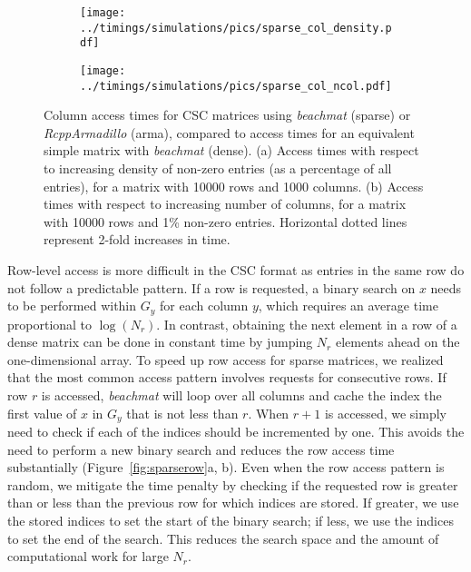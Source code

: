 \documentclass[10pt,letterpaper]{article}
\newcommand{\beachmat}{\textit{beachmat}}
\begin{document}

\begin{figure}[bt]
    \centering
    \begin{subfigure}[b]{0.49\textwidth}
        \texttt{[image: ../timings/simulations/pics/sparse\_col\_density.pdf]}
        \caption{}
    \end{subfigure}
    \begin{subfigure}[b]{0.49\textwidth}
        \texttt{[image: ../timings/simulations/pics/sparse\_col\_ncol.pdf]}
        \caption{}
    \end{subfigure}
    \caption{Column access times for CSC matrices using \beachmat{} (sparse) or \textit{RcppArmadillo} (arma), compared to access times for an equivalent simple matrix with \beachmat{} (dense).
        (a) Access times with respect to increasing density of non-zero entries (as a percentage of all entries), for a matrix with 10000 rows and 1000 columns.
        (b) Access times with respect to increasing number of columns, for a matrix with 10000 rows and 1\% non-zero entries.
        Horizontal dotted lines represent 2-fold increases in time.
    }
    \label{fig:sparsecol}
\end{figure}

Row-level access is more difficult in the CSC format as entries in the same row do not follow a predictable pattern.
If a row is requested, a binary search on $x$ needs to be performed within $G_y$ for each column $y$, which requires an average time proportional to $\log(N_r)$.
In contrast, obtaining the next element in a row of a dense matrix can be done in constant time by jumping $N_r$ elements ahead on the one-dimensional array.
To speed up row access for sparse matrices, we realized that the most common access pattern involves requests for consecutive rows.
If row $r$ is accessed, \beachmat{} will loop over all columns and cache the index the first value of $x$ in $G_y$ that is not less than $r$.
When $r+1$ is accessed, we simply need to check if each of the indices should be incremented by one.
This avoids the need to perform a new binary search and reduces the row access time substantially (Figure~\ref{fig:sparserow}a, b).
Even when the row access pattern is random, we mitigate the time penalty by checking if the requested row is greater than or less than the previous row for which indices are stored.
If greater, we use the stored indices to set the start of the binary search; if less, we use the indices to set the end of the search. 
This reduces the search space and the amount of computational work for large $N_r$.
\end{document}
